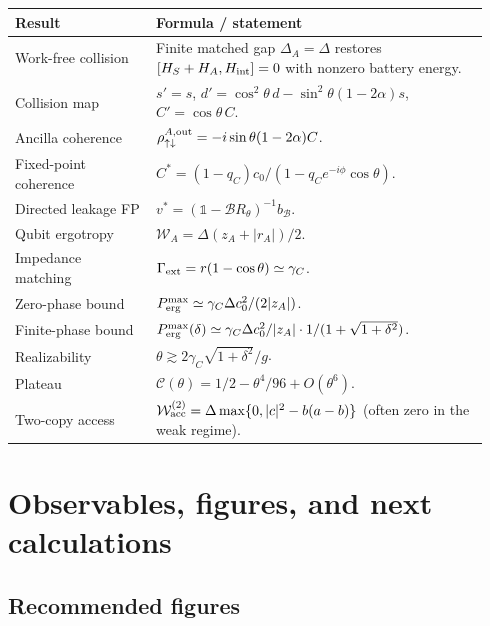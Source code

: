 \documentclass[11pt,a4paper]{article}
\newcommand{\id}{\mathbb{1}}
\newcommand{\W}{\mathcal{W}}
\begin{document}
\begin{longtable}{p{0.28\linewidth}p{0.66\linewidth}}
\toprule
Result & Formula / statement \\
\midrule
Work-free collision & Finite matched gap $\Delta_A=\Delta$ restores $[H_S+H_A,H_{\rm int}]=0$ with nonzero battery energy. \\
Collision map & $s'=s$, $d'=\cos^2\theta\,d-\sin^2\theta(1-2\alpha)s$, $C'=\cos\theta\,C$. \\
Ancilla coherence & $\rho_{\uparrow\downarrow}^{A,{\rm out}}=-i\sin\theta(1-2\alpha)C$. \\
Fixed-point coherence & $C^*=(1-q_C)c_0/(1-q_C e^{-i\phi}\cos\theta)$. \\
Directed leakage FP & $v^*=(\id-\mathcal B R_\theta)^{-1}b_{\mathcal B}$. \\
Qubit ergotropy & $\W_A=\Delta(z_A+|r_A|)/2$. \\
Impedance matching & $\Gamma_{\rm ext}=r(1-\cos\theta)\simeq\gamma_C$. \\
Zero-phase bound & $P_{\rm erg}^{\rm max}\simeq\gamma_C\Delta c_0^2/(2|z_A|)$. \\
Finite-phase bound & $P_{\rm erg}^{\rm max}(\delta)\simeq\gamma_C\Delta c_0^2/|z_A|\cdot 1/(1+\sqrt{1+\delta^2})$. \\
Realizability & $\theta\gtrsim 2\gamma_C\sqrt{1+\delta^2}/g$. \\
Plateau & $\mathcal C(\theta)=1/2-\theta^4/96+O(\theta^6)$. \\
Two-copy access & $\W_{\rm acc}^{(2)}=\Delta\max\{0,|c|^2-b(a-b)\}$ (often zero in the weak regime). \\
\bottomrule
\end{longtable}

\section{Observables, figures, and next calculations}\label{sec:observables}

\subsection{Recommended figures}
\end{document}
